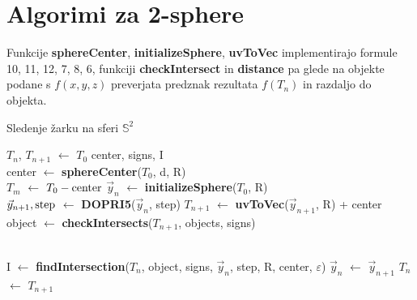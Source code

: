 \documentclass[titlepage]{article}
\begin{document}
\newpage
\section{Algorimi za 2-sphere}
Funkcije \textbf{sphereCenter}, \textbf{initializeSphere}, \textbf{uvToVec} implementirajo formule 10, 11, 12, 7, 8, 6, funkciji \textbf{checkIntersect} in \textbf{distance} pa glede na objekte 
podane s $f(x,y,z)$ preverjata predznak rezultata $f(T_{n})$ in razdaljo do objekta. %
\begin{algorithm}
    \caption{Sledenje žarku na sferi $\mathbb{S}^{2}$}
\begin{algorithmic}

    \State $T_{n}$, $T_{n+1}$ $\gets$ $T_{0}$
    \State center, signs, I 
    \\
    \State {}
      \State center $\gets$ \textbf{sphereCenter}($T_{0}$, d, R)
      \\
      \State $T_{m}$ $\gets$ $T_{0} - \hbox{center}$
      \State $\vec{y}_{n}$ $\gets$ \textbf{initializeSphere}($T_{0}$, R) %
    \EndIf
    \\
    \State $\vec{y}_{n+1}, \hbox{step}$ $\gets$ \textbf{DOPRI5}($\vec{y}_{n}$, step) %
    \State $T_{n+1}$ $\gets$ \textbf{uvToVec}($\vec{y}_{n+1}$, R) + center %
    \\
    \State object $\gets$ \textbf{checkIntersects}($T_{n+1}$, objects, signs)
    \\
    \\

      \State I $\gets$ \textbf{findIntersection}($T_{n}$, object, signs, $\vec{y}_{n}$, step, R, center, $\varepsilon$)
      \State {}
    \Else
      \State $\vec{y}_{n}$ $\gets$ $\vec{y}_{n+1}$
      \State $T_{n}$ $\gets$ $T_{n+1}$
    \EndIf
  \EndWhile
\EndFunction
\end{algorithmic}
\end{algorithm}
\end{document}
